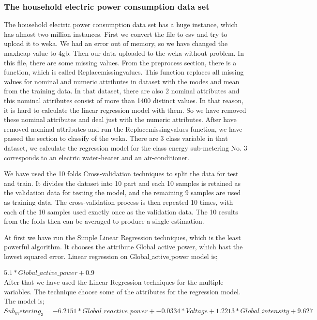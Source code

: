\documentclass[a4paper]{article}
\begin{document}
\subsubsection{The household electric power consumption data set}
The household electric power consumption data set has a huge instance, which has almost two million instances. First we convert the file to csv and try to upload it to weka. We had an error out of memory, so we have changed the maxheap value to 4gb. Then our data uploaded to the weka without problem. In this file, there are some missing values. From the preprocess section, there is a function, which is called Replacemissingvalues. This function replaces all missing values for nominal and numeric attributes in dataset with the modes and mean from the training data. In that dataset, there are also 2 nominal attributes and this nominal attributes consist of more than 1400 distinct values. In that reason, it is hard to calculate the linear regression model with them. So we have removed these nominal attributes and deal just with the numeric attributes. After have removed nominal attributes and run the Replacemissingvalues function, we have passed the section to classify of the weka. There are 3 class variable in that dataset, we calculate the regression model for the class energy sub-metering No. 3 corresponds to an electric water-heater and an air-conditioner.

We have used the 10 folds Cross-validation techniques to split the data for test and train. It divides the dataset into 10 part and each 10 samples is retained as the validation data for testing the model, and the remaining 9 samples are used as training data. The cross-validation process is then repeated 10 times, with each of the 10 samples used exactly once as the validation data. The 10 results from the folds then can be averaged to produce a single estimation.  

At first we have run the Simple Linear Regression techniques, which is the least powerful algorithm. It chooses the attribute Global$\_$active$\_$power, which hast the lowest squared error. Linear regression on Global$\_$active$\_$power model is; 

$5.1 * Global\_active\_power + 0.9$\\

After that we have used the Linear Regression techniques for the multiple variables. The technique choose some of the attributes for the regression model. The model is;\\
$Sub_metering_3 =
     -6.2151 * Global\_reactive\_power +
     -0.0334 * Voltage +
      1.2213 * Global\_intensity +
      9.627 $\\
\end{document}
